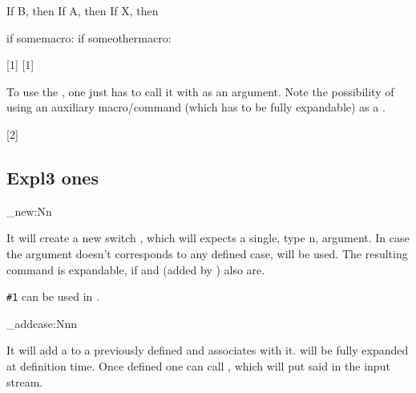 \documentclass[10pt]{article}
\begin{document}
\begin{codestore}[switch02]
\def\somemacro{case-A}
\def\someothermacro{case-X}

If B, then 
If A, then 
If X, then 

if somemacro: \myCase{\somemacro}
if someothermacro: \myCase{\someothermacro}
\end{codestore}

[1]
[1]

To use the , one just has to call it with  as an argument. Note the possibility of using an auxiliary macro/command (which has to be fully expandable) as a .

[2]


\subsection{Expl3 ones}
\begin{codedescribe}{\switch_new:Nn}
\begin{codesyntax}%
  
\end{codesyntax}
It will create a new switch , which will expects a single, type n, argument. In case the argument doesn't corresponds to any defined case,  will be used. The resulting  command is expandable, if  and  (added by ) also are. 
\end{codedescribe}
\begin{tsremark}
  \verb|#1| can be used in .
\end{tsremark}

\begin{codedescribe}{\switch_addcase:Nnn}
\begin{codesyntax}%
  
\end{codesyntax}
It will add a  to a previously defined  and associates  with it.  will be fully expanded at definition time. Once defined one can call , which will put said  in the input stream. 
\end{codedescribe}
\end{document}
